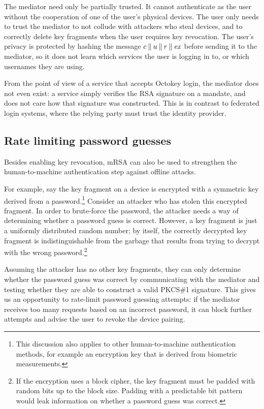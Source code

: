 The mediator need only be partially trusted. It cannot authenticate as the user without the
cooperation of one of the user's physical devices. The user only needs to trust the mediator to not
collude with attackers who steal devices, and to correctly delete key fragments when the user
requires key revocation. The user's privacy is protected by hashing the message
$c \mathbin{\|} u \mathbin{\|} r \mathbin{\|} \mathit{ex}$ before sending it to the mediator, so it does not learn
which services the user is logging in to, or which usernames they are using.

From the point of view of a service that accepts Octokey login, the mediator does not even exist: a
service simply verifies the RSA signature on a mandate, and does not care how that signature was
constructed. This is in contrast to federated login systems, where the relying party must trust the
identity provider.

\subsection{Rate limiting password guesses}\label{sec:ratelimit}

Besides enabling key revocation, mRSA can also be used to strengthen the human-to-machine
authentication step against offline attacks.

For example, say the key fragment on a device is encrypted with a symmetric key derived from a
password.\footnote{This discussion also applies to other human-to-machine authentication methods,
for example an encryption key that is derived from biometric measurements.} Consider an attacker who
has stolen this encrypted fragment. In order to brute-force the password, the attacker needs a way
of determining whether a password guess is correct. However, a key fragment is just a uniformly
distributed random number; by itself, the correctly decrypted key fragment is indistinguishable from
the garbage that results from trying to decrypt with the wrong password.\footnote{If the encryption
uses a block cipher, the key fragment must be padded with random bits up to the block size. Padding
with a predictable bit pattern would leak information on whether a password guess was correct.}

Assuming the attacker has no other key fragments, they can only determine whether the password guess
was correct by communicating with the mediator and testing whether they are able to construct a
valid PKCS\#1 signature. This gives us an opportunity to rate-limit password guessing attempts: if
the mediator receives too many requests based on an incorrect password, it can block further
attempts and advise the user to revoke the device pairing.

